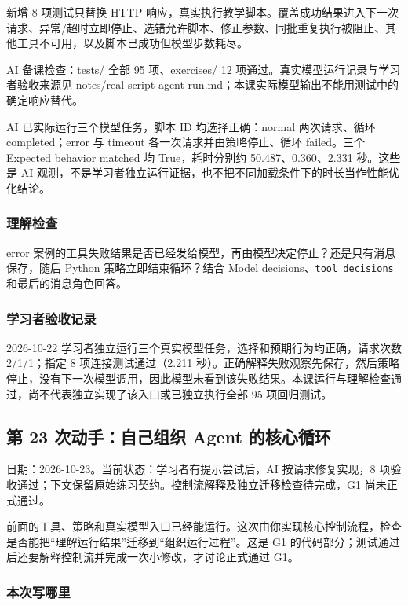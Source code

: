 \documentclass[UTF8,zihao=-4,fontset=fandol]{ctexart}
\begin{document}
新增 8 项测试只替换 HTTP 响应，真实执行教学脚本。覆盖成功结果进入下一次请求、异常/超时立即停止、选错允许脚本、修正参数、同批重复执行被阻止、其他工具不可用，以及脚本已成功但模型步数耗尽。

AI 备课检查：tests/ 全部 95 项、exercises/ 12 项通过。真实模型运行记录与学习者验收来源见 notes/real-script-agent-run.md；本课实际模型输出不能用测试中的确定响应替代。

AI 已实际运行三个模型任务，脚本 ID 均选择正确：normal 两次请求、循环 completed；error 与 timeout 各一次请求并由策略停止、循环 failed。三个 Expected behavior matched 均 True，耗时分别约 50.487、0.360、2.331 秒。这些是 AI 观测，不是学习者独立运行证据，也不把不同加载条件下的时长当作性能优化结论。

\subsubsection{理解检查}

error 案例的工具失败结果是否已经发给模型，再由模型决定停止？还是只有消息保存，随后 Python 策略立即结束循环？结合 Model decisions、\nolinkurl{tool_decisions} 和最后的消息角色回答。

\subsubsection{学习者验收记录}

2026-10-22 学习者独立运行三个真实模型任务，选择和预期行为均正确，请求次数 2/1/1；指定 8 项连接测试通过（2.211 秒）。正确解释失败观察先保存，然后策略停止，没有下一次模型调用，因此模型未看到该失败结果。本课运行与理解检查通过，尚不代表独立实现了该入口或已独立执行全部 95 项回归测试。

\subsection{第 23 次动手：自己组织 Agent 的核心循环}

日期：2026-10-23。当前状态：学习者有提示尝试后，AI 按请求修复实现，8 项验收通过；下文保留原始练习契约。控制流解释及独立迁移检查待完成，G1 尚未正式通过。

前面的工具、策略和真实模型入口已经能运行。这次由你实现核心控制流程，检查是否能把“理解运行结果”迁移到“组织运行过程”。这是 G1 的代码部分；测试通过后还要解释控制流并完成一次小修改，才讨论正式通过 G1。

\subsubsection{本次写哪里}
\end{document}
